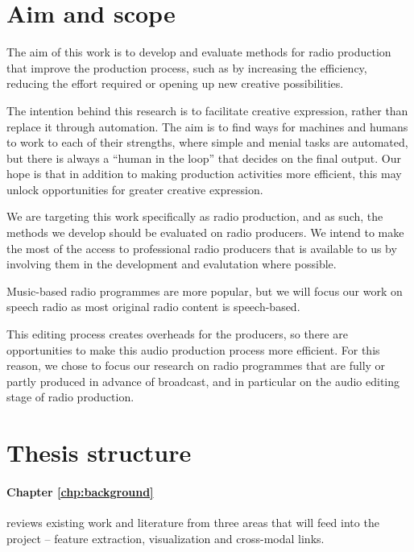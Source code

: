 \section{Aim and scope}

The aim of this work is to develop and evaluate methods for radio production that improve the production process, such
as by increasing the efficiency, reducing the effort required or opening up new creative possibilities.

The intention behind this research is to facilitate creative expression, rather than replace it through automation.
The aim is to find ways for machines and humans to work to each of their strengths, where simple and menial tasks are
automated, but there is always a ``human in the loop'' that decides on the final output.  Our hope is that in addition
to making production activities more efficient, this may unlock opportunities for greater creative expression.

We are targeting this work specifically as radio production, and as such, the methods we develop should be evaluated on
radio producers. We intend to make the most of the access to professional radio producers that is available to us by
involving them in the development and evalutation where possible.

Music-based radio programmes are more popular, but we will focus our work on speech radio as most original radio
content is speech-based.

This editing process creates overheads for the producers, so there are opportunities to make this audio production
process more efficient.  For this reason, we chose to focus our research on radio programmes that are fully or partly
produced in advance of broadcast, and in particular on the audio editing stage of radio production.

\section{Thesis structure}\label{sec:intro/structure}

\paragraph{Chapter \ref{chp:background}} reviews existing work and literature from three areas that will feed into the
project -- feature extraction, visualization and cross-modal links.

